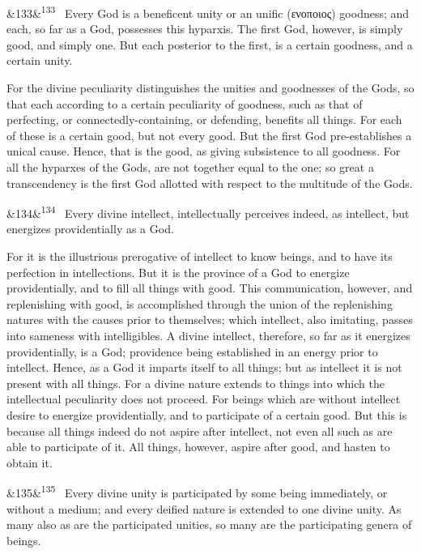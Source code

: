 \documentclass[12pt]{article}
\newcommand{\para}[1][]{\par\noindent\ifx&#1&\else\textsuperscript{\footnotesize #1}~\fi}
\begin{document}
\para[133] Every God is a beneficent unity or an unific (ενοποιος) goodness; and each, so far as a God, possesses this hyparxis. The first God, however, is simply good, and simply one. But each posterior to the first, is a certain goodness, and a certain unity.

For the divine peculiarity distinguishes the unities and goodnesses of the Gods, so that each according to a certain peculiarity of goodness, such as that of perfecting, or connectedly-containing, or defending, benefits all things. For each of these is a certain good, but not every good. But the first God pre-establishes a unical cause. Hence, that is the good, as giving subsistence to all goodness. For all the hyparxes of the Gods, are not together equal to the one; so great a transcendency is the first God allotted with respect to the multitude of the Gods.

\para[134] Every divine intellect, intellectually perceives indeed, as intellect, but energizes providentially as a God.

For it is the illustrious prerogative of intellect to know beings, and to have its perfection in intellections. But it is the province of a God to energize providentially, and to fill all things with good. This communication, however, and replenishing with good, is accomplished through the union of the replenishing natures with the causes prior to themselves; which intellect, also imitating, passes into sameness with intelligibles. A divine intellect, therefore, so far as it energizes providentially, is a God; providence being established in an energy prior to intellect. Hence, as a God it imparts itself to all things; but as intellect it is not present with all things. For a divine nature extends to things into which the intellectual peculiarity does not proceed. For beings which are without intellect desire to energize providentially, and to participate of a certain good. But this is because all things indeed do not aspire after intellect, not even all such as are able to participate of it. All things, however, aspire after good, and hasten to obtain it.

\para[135] Every divine unity is participated by some being immediately, or without a medium; and every deified nature is extended to one divine unity. As many also as are the participated unities, so many are the participating genera of beings.
\end{document}
